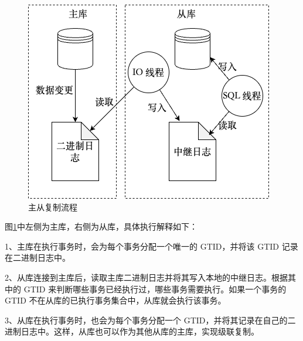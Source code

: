 \begin{figure}[H]
    \centering
    \includegraphics[width=0.8\linewidth]{../design/GTID-Replication.png}
    \caption{主从复制流程}
    \label{fig:GTID-Replication}
\end{figure}

图\ref{fig:GTID-Replication}中左侧为主库，右侧为从库，具体执行解释如下：

1、主库在执行事务时，会为每个事务分配一个唯一的 GTID，并将该 GTID 记录在二进制日志中。

2、从库连接到主库后，读取主库二进制日志并将其写入本地的中继日志。根据其中的 GTID 来判断哪些事务已经执行过，哪些事务需要执行。如果一个事务的 GTID 不在从库的已执行事务集合中，从库就会执行该事务。

3、从库在执行事务时，也会为每个事务分配一个 GTID，并将其记录在自己的二进制日志中。这样，从库也可以作为其他从库的主库，实现级联复制。
